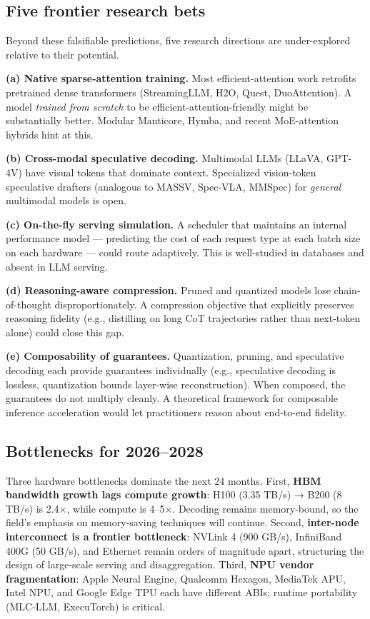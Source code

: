 \subsection{Five frontier research bets}\label{five-frontier-research-bets}

Beyond these falsifiable predictions, five research directions are under-explored relative to their potential.

\textbf{(a) Native sparse-attention training.} Most efficient-attention work retrofits pretrained dense transformers (StreamingLLM, H2O, Quest, DuoAttention). A model \emph{trained from scratch} to be efficient-attention-friendly might be substantially better. Modular Manticore, Hymba, and recent MoE-attention hybrids hint at this.

\textbf{(b) Cross-modal speculative decoding.} Multimodal LLMs (LLaVA, GPT-4V) have visual tokens that dominate context. Specialized vision-token speculative drafters (analogous to MASSV, Spec-VLA, MMSpec) for \emph{general} multimodal models is open.

\textbf{(c) On-the-fly serving simulation.} A scheduler that maintains an internal performance model --- predicting the cost of each request type at each batch size on each hardware --- could route adaptively. This is well-studied in databases and absent in LLM serving.

\textbf{(d) Reasoning-aware compression.} Pruned and quantized models lose chain-of-thought disproportionately. A compression objective that explicitly preserves reasoning fidelity (e.g., distilling on long CoT trajectories rather than next-token alone) could close this gap.

\textbf{(e) Composability of guarantees.} Quantization, pruning, and speculative decoding each provide guarantees individually (e.g., speculative decoding is lossless, quantization bounds layer-wise reconstruction). When composed, the guarantees do not multiply cleanly. A theoretical framework for composable inference acceleration would let practitioners reason about end-to-end fidelity.

\subsection{Bottlenecks for 2026--2028}\label{bottlenecks-for-20262028}

Three hardware bottlenecks dominate the next 24 months. First, \textbf{HBM bandwidth growth lags compute growth}: H100 (3.35 TB/s) → B200 (8 TB/s) is 2.4×, while compute is 4--5×. Decoding remains memory-bound, so the field's emphasis on memory-saving techniques will continue. Second, \textbf{inter-node interconnect is a frontier bottleneck}: NVLink 4 (900 GB/s), InfiniBand 400G (50 GB/s), and Ethernet remain orders of magnitude apart, structuring the design of large-scale serving and disaggregation. Third, \textbf{NPU vendor fragmentation}: Apple Neural Engine, Qualcomm Hexagon, MediaTek APU, Intel NPU, and Google Edge TPU each have different ABIs; runtime portability (MLC-LLM, ExecuTorch) is critical.


